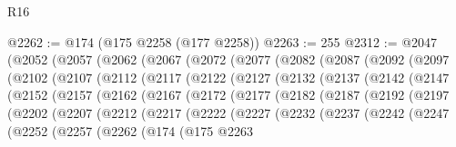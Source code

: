 \begin{lexlean}{R16}
\begin{coremodule}
@2262 := @174 (@175 @2258 (@177 @2258))
@2263 := 255
@2312 := @2047
    (@2052
      (@2057
        (@2062
          (@2067
            (@2072
              (@2077
                (@2082
                  (@2087
                    (@2092
                      (@2097
                        (@2102
                          (@2107
                            (@2112
                              (@2117
                                (@2122
                                  (@2127
                                    (@2132
                                      (@2137
                                        (@2142
                                          (@2147
                                            (@2152
                                              (@2157
                                                (@2162
                                                  (@2167
                                                    (@2172
                                                      (@2177
                                                        (@2182
                                                          (@2187
                                                            (@2192
                                                              (@2197
                                                                (@2202
                                                                  (@2207
                                                                    (@2212
                                                                      (@2217
                                                                        (@2222
                                                                          (@2227
                                                                            (@2232
                                                                              (@2237
                                                                                (@2242
                                                                                  (@2247
                                                                                    (@2252
                                                                                      (@2257
                                                                                        (@2262
                                                                                          (@174
                                                                                            (@175
                                                                                              @2263

\end{coremodule}
\end{lexlean}
